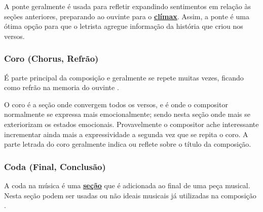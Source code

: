A ponte geralmente é usada para refletir expandindo sentimentos em relação às seções anteriores,
preparando ao ouvinte para o \hyperref[ref:climax]{\textbf{clímax}}.
Assim, a ponte é uma ótima opção para que o letrista agregue informação da história que criou nos versos.

\subsubsection{Coro (Chorus, Refrão)}
\label{ref:Coro}

É parte principal da composição  
e geralmente  se repete muitas vezes, 
ficando como refrão na memoria do ouvinte
\cite[pp. 18]{adolfo1997composicao}.

O coro é a seção onde convergem todos os versos, 
e é onde o compositor normalmente se expressa mais emocionalmente;
sendo nesta seção onde mais se exteriorizam os estados emocionais. 
Provavelmente o compositor ache interessante incrementar ainda mais a 
expressividade a segunda vez que se repita o coro.
A parte letrada do coro geralmente indica ou reflete sobre o título da composição.

\subsubsection{Coda (Final, Conclusão)}
\label{ref:Coda}
A coda na música é uma \hyperref[ref:Secao]{\textbf{seção}}  que é adicionada ao final de uma peça musical. 
Nesta seção podem ser usadas ou não ideais musicais já utilizadas na composição
\cite[pp. 17]{adolfo1997composicao}.






